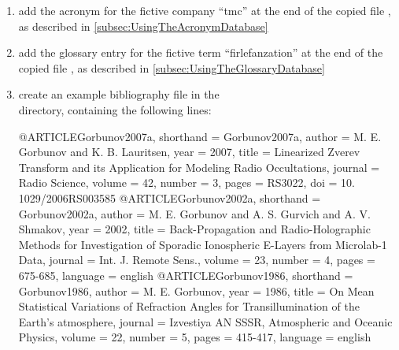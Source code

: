 \begin{enumerate}
\item add the acronym for the fictive company ``\acf{tmc}'' at the end of
  the copied file , as described in
  \autoref{subsec:UsingTheAcronymDatabase}

\item add the glossary entry for the fictive term ``\Gls{firlefanzation}''
  at the end of the copied file , as described in
  \autoref{subsec:UsingTheGlossaryDatabase}

\item create an example bibliography file  in the\\
   directory, containing the
  following lines:

  \begin{CommandLineListing}[style=DefaultFileListing, print=true,
    basicstyle={\ttfamily\small}, %
    basewidth=0.47em, xleftmargin=0pt, gobble=4, %
    caption={Example bibliography file \latexcmd{exampleBibFile.bib}}, %
    label=lst:exampleBibliographyFile]

    @ARTICLE{Gorbunov2007a,
      shorthand = {Gorbunov2007a},
      author = {M. E. Gorbunov and K. B. Lauritsen},
      year = 2007,
      title = {{L}inearized {Z}verev {T}ransform and its Application for Modeling
        Radio Occultations},
      journal = {Radio Science},
      volume = 42,
      number = 3,
      pages = {RS3022},
      doi = {10. 1029/2006RS003585}
    }
    @ARTICLE{Gorbunov2002a,
      shorthand = {Gorbunov2002a},
      author = {M. E. Gorbunov and A. S. Gurvich and A. V. Shmakov},
      year = 2002,
      title = {Back-Propagation and Radio-Holographic Methods for Investigation of
        Sporadic Ionospheric {E}-Layers from {M}icrolab-1 Data},
      journal = {Int. J. Remote Sens.},
      volume = 23,
      number = 4,
      pages = {675-685},
      language = {english}
    }
    @ARTICLE{Gorbunov1986,
      shorthand = {Gorbunov1986},
      author = {M. E. Gorbunov},
      year = 1986,
      title = {On Mean Statistical Variations of Refraction Angles for
        Transillumination of the Earth's atmosphere},
      journal = {Izvestiya AN SSSR, Atmospheric and Oceanic Physics},
      volume = 22,
      number = 5,
      pages = {415-417},
      language = {english}
    }
  \end{CommandLineListing}


\end{enumerate}
